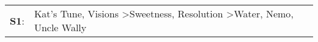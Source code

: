 \begin{supertabular}{p{0.03\textwidth}p{0.92\textwidth}}
 \textbf{S1}:  &  Kat's Tune\textsuperscript{}, \enspace Visions\textsuperscript{} \textgreater \enspace Sweetness\textsuperscript{}, \enspace Resolution\textsuperscript{} \textgreater \enspace Water\textsuperscript{}, \enspace Nemo\textsuperscript{}, \enspace Uncle Wally\textsuperscript{}  \enspace  \\
\end{supertabular}
